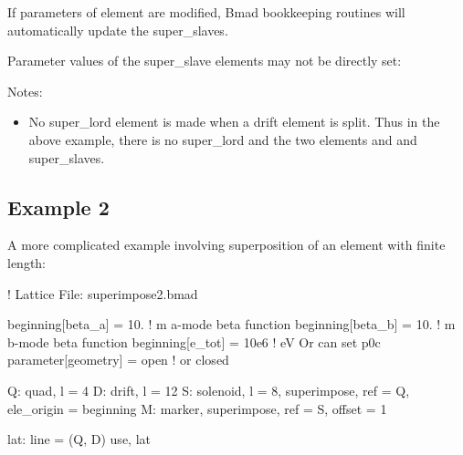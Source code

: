\documentclass{hitec}
\begin{document}
If parameters of element  are modified, Bmad bookkeeping routines will automatically update the super_slaves.

Parameter values of the super_slave elements may not be directly set:

Notes:
\begin{itemize}
\item No super_lord element is made when a drift element is split. Thus in the above example, there is no  super_lord and
the two elements  and  and  super_slaves.
\end{itemize}

\subsection{Example 2}


A more complicated example involving superposition of an element with finite length:
\begin{code}
! Lattice File: superimpose2.bmad

beginning[beta_a] = 10.   ! m  a-mode beta function
beginning[beta_b] = 10.   ! m  b-mode beta function
beginning[e_tot] = 10e6   ! eV   Or can set p0c
parameter[geometry] = open      ! or closed

Q: quad, l = 4
D: drift, l = 12
S: solenoid, l = 8, superimpose, ref = Q, ele_origin = beginning
M: marker, superimpose, ref = S, offset = 1

lat: line = (Q, D)
use, lat
\end{code}
\end{document}
